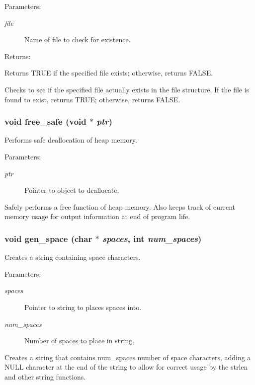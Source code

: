 \begin{Desc}
\item[Parameters: ]\par
\begin{description}
\item[{\em 
file}]Name of file to check for existence. \end{description}
\end{Desc}
\begin{Desc}
\item[Returns: ]\par
Returns TRUE if the specified file exists; otherwise, returns FALSE.\end{Desc}
Checks to see if the specified file actually exists in the file structure. If the file is found to exist, returns TRUE; otherwise, returns FALSE. 
\subsubsection{\setlength{\rightskip}{0pt plus 5cm}void free\_\-safe (void $\ast$ {\em ptr})}\label{util_8c_a13}


Performs safe deallocation of heap memory.

\begin{Desc}
\item[Parameters: ]\par
\begin{description}
\item[{\em 
ptr}]Pointer to object to deallocate.\end{description}
\end{Desc}
Safely performs a free function of heap memory. Also keeps track of current memory usage for output information at end of program life. 
\subsubsection{\setlength{\rightskip}{0pt plus 5cm}void gen\_\-space (char $\ast$ {\em spaces}, int {\em num\_\-spaces})}\label{util_8c_a14}


Creates a string containing space characters.

\begin{Desc}
\item[Parameters: ]\par
\begin{description}
\item[{\em 
spaces}]Pointer to string to places spaces into. \item[{\em 
num\_\-spaces}]Number of spaces to place in string.\end{description}
\end{Desc}
Creates a string that contains num\_\-spaces number of space characters, adding a NULL character at the end of the string to allow for correct usage by the strlen and other string functions. 
